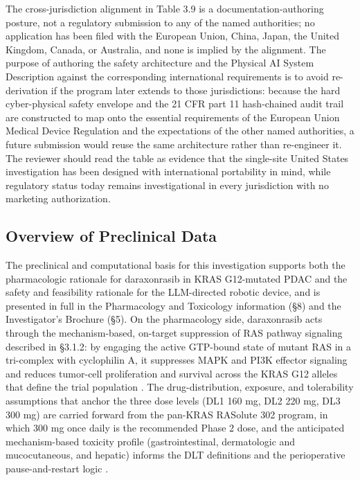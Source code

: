 The cross-jurisdiction alignment in Table 3.9 is a documentation-authoring posture,
not a regulatory submission to any of the named authorities; no application has been
filed with the European Union, China, Japan, the United Kingdom, Canada, or
Australia, and none is implied by the alignment. The purpose of authoring the safety
architecture and the Physical AI System Description against the corresponding
international requirements is to avoid re-derivation if the program later extends to
those jurisdictions: because the hard cyber-physical safety envelope and the 21 CFR
part 11 hash-chained audit trail are constructed to map onto the essential
requirements of the European Union Medical Device Regulation and the expectations of
the other named authorities, a future submission would reuse the same architecture
rather than re-engineer it. The reviewer should read the table as evidence that the
single-site United States investigation has been designed with international
portability in mind, while regulatory status today remains investigational in
every jurisdiction with no marketing authorization.

\subsection{Overview of Preclinical Data}

The preclinical and computational basis for this investigation supports both the
pharmacologic rationale for daraxonrasib in KRAS G12-mutated PDAC and the safety and
feasibility rationale for the LLM-directed robotic device, and is presented in full
in the Pharmacology and Toxicology information (\S 8) and the Investigator's
Brochure (\S 5). On the pharmacology side, daraxonrasib acts through the
mechanism-based, on-target suppression of RAS pathway signaling described in
\S 3.1.2: by engaging the active GTP-bound state of mutant RAS in a tri-complex with
cyclophilin A, it suppresses MAPK and PI3K effector signaling and reduces tumor-cell
proliferation and survival across the KRAS G12 alleles that define the trial
population \cite{daraxwhipple}. The drug-distribution, exposure, and tolerability
assumptions that anchor the three dose levels (DL1 160 mg, DL2 220 mg, DL3 300 mg)
are carried forward from the pan-KRAS RASolute 302 program, in which 300 mg once
daily is the recommended Phase 2 dose, and the anticipated mechanism-based toxicity
profile (gastrointestinal, dermatologic and mucocutaneous, and hepatic) informs the
DLT definitions and the perioperative pause-and-restart logic \cite{onpremwhippl}.

